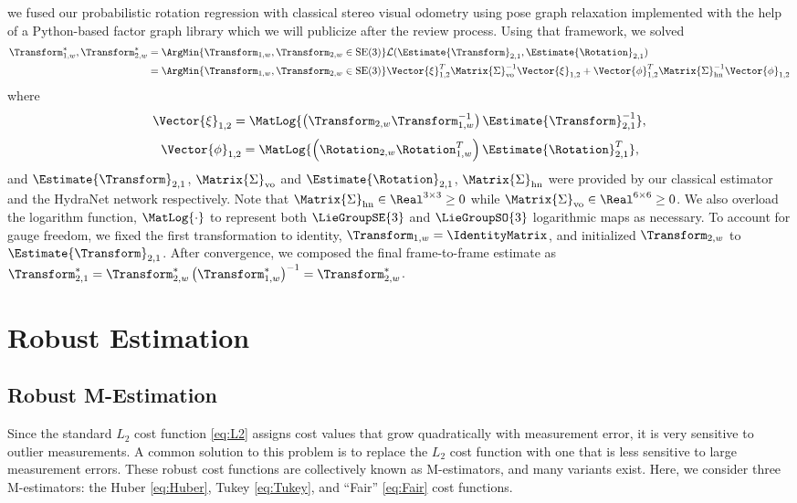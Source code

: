 we fused our probabilistic rotation regression with classical stereo visual odometry using pose graph relaxation implemented with the help of a Python-based factor graph library which we will publicize after the review process. Using that framework, we solved
\begin{align}
	\Transform_{1,w}^*, \Transform_{2,w}^* &= \ArgMin{\Transform_{1,w}, \Transform_{2,w}\in\text{SE}(3)}\mathcal{L}(\Estimate{\Transform}_{2,1}, \Estimate{\Rotation}_{2,1}) \\ & = \ArgMin{\Transform_{1,w}, \Transform_{2,w}\in\text{SE}(3)} \Vector{\xi}_\text{1,2}^T \Matrix{\Sigma}^{-1}_\text{vo} \Vector{\xi}_\text{1,2} + \Vector{\phi}_\text{1,2}^T \Matrix{\Sigma}^{-1}_{\text{hn}} \Vector{\phi}_\text{1,2} 
\end{align}
where
\begin{equation}
	\Vector{\xi}_\text{1,2} =  \MatLog{\left(\Transform_{2,w} \Transform_{1,w}^{-1} \right)\Estimate{\Transform}_{2,1}^{-1}},
\end{equation}
\begin{equation}
	\Vector{\phi}_\text{1,2} =  \MatLog{\left(\Rotation_{2,w} \Rotation_{1,w}^{T} \right)\Estimate{\Rotation}_{2,1}^{T}},
\end{equation}
and $\Estimate{\Transform}_{2,1}$, $\Matrix{\Sigma}_\text{vo}$ and $\Estimate{\Rotation}_{2,1}$, $\Matrix{\Sigma}_{\text{hn}}$ were provided by our classical estimator and the HydraNet network respectively. Note that $\Matrix{\Sigma}_{\text{hn}} \in \Real^{3 \times 3} \geq 0$ while $\Matrix{\Sigma}_{\text{vo}} \in \Real^{6 \times 6} \geq 0 $. We also overload the logarithm function, $\MatLog{\cdot}$ to represent both $\LieGroupSE{3}$ and $\LieGroupSO{3}$ logarithmic maps as necessary. To account for gauge freedom, we fixed the first transformation to identity, $\Transform_{1,w} = \IdentityMatrix$, and initialized $\Transform_{2,w}$ to  $\Estimate{\Transform}_{2,1}$.  After convergence, we composed the final frame-to-frame estimate as $ \Transform_{2,1}^* =  \Transform_{2,w}^*  \left(\Transform_{1,w}^*\right)^{-1} = \Transform_{2,w}^*$.




\section{Robust Estimation}
\subsection{Robust M-Estimation}
Since the standard $L_2$ cost function \eqref{eq:L2} assigns cost values that grow quadratically with measurement error, it is very sensitive to outlier measurements.
A common solution to this problem is to replace the $L_2$ cost function with one that is less sensitive to large measurement errors.
These robust cost functions are collectively known as M-estimators, and many variants exist.
Here, we consider three M-estimators: the Huber \eqref{eq:Huber}, Tukey \eqref{eq:Tukey}, and ``Fair'' \eqref{eq:Fair} cost functions.



